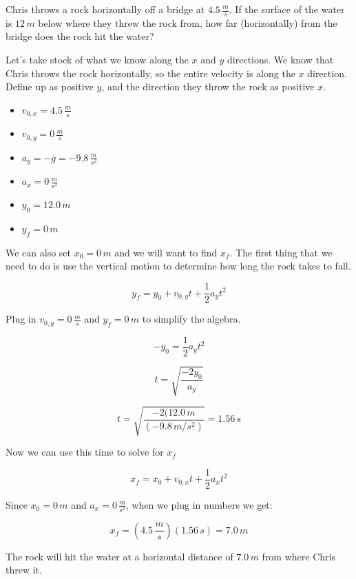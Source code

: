 \documentclass[12pt]{book}
\begin{document}
\begin{exampleblock}

Chris throws a rock horizontally off a bridge at $4.5 \, \frac{m}{s}$. If the surface of the water is $12 \, m$ below where they threw the rock from, how far (horizontally) from the bridge does the rock hit the water?

\hspace{10pt}

Let's take stock of what we know along the $x$ and $y$ directions. We know that Chris throws the rock horizontally, so the entire velocity is along the $x$ direction. Define up as positive $y$, and the direction they throw the rock as positive $x$.

\begin{itemize}
\item $v_{0,x} = 4.5 \, \frac{m}{s}$
\item $v_{0,y} = 0 \, \frac{m}{s}$
\item $a_y = -g = -9.8 \, \frac{m}{s^2}$
\item $a_x = 0 \, \frac{m}{s^2}$
\item $y_0 = 12.0 \, m$
\item $y_f = 0 \, m$
\end{itemize}

We can also set $x_0 = 0 \, m$ and we will want to find $x_f$. The first thing that we need to do is use the vertical motion to determine how long the rock takes to fall.

\begin{equation}
y_f = y_0 + v_{0,y} t + \frac{1}{2} a_y t^2
\end{equation}

Plug in $v_{0,y} = 0 \, \frac{m}{s}$ and $y_f = 0 \, m$ to simplify the algebra.

\begin{equation}
-y_0 = \frac{1}{2} a_y t^2 
\end{equation}

\begin{equation}
t = \sqrt{\frac{-2 y_0}{a_y}}
\end{equation}

\begin{equation}
t = \sqrt{\frac{-2 (12.0 \, m}{(-9.8 \, m/s^2)}} = 1.56 \, s
\end{equation}

Now we can use this time to solve for $x_f$

\begin{equation}
x_f = x_0 + v_{0,x} t + \frac{1}{2} a_x t^2
\end{equation}

Since $x_0 = 0 \, m$ and $a_x = 0 \, \frac{m}{s^2}$, when we plug in numbers we get:

\begin{equation}
x_f = (4.5 \, \frac{m}{s}) (1.56 \, s) = 7.0 \, m
\end{equation}

The rock will hit the water at a horizontal distance of $7.0 \, m$ from where Chris threw it.

\end{exampleblock}
\end{document}
